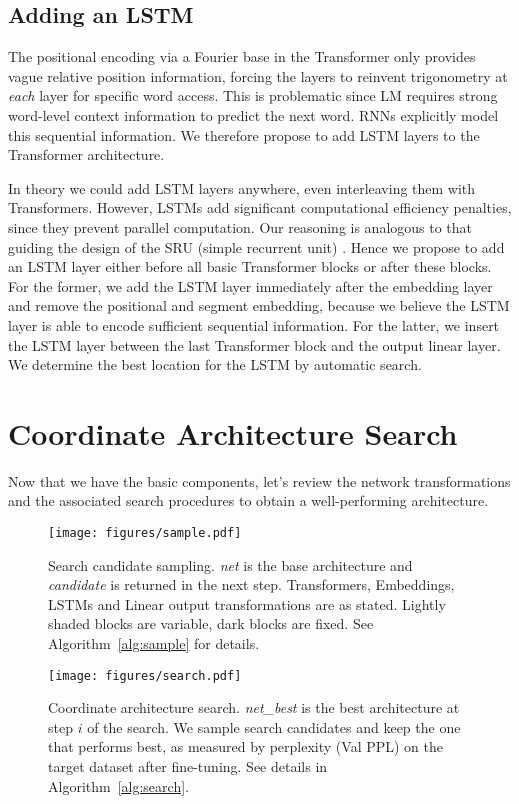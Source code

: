 \documentclass[11pt,a4paper]{article}
\begin{document}
\subsection{Adding an LSTM}

The positional encoding via a Fourier base in the Transformer only provides vague relative position information, forcing the layers to reinvent trigonometry at \emph{each} layer for specific word access. This is problematic since LM requires  strong word-level context information to predict the next word. RNNs explicitly model this sequential information. We therefore propose to add LSTM layers to the Transformer architecture. 

In theory we could add LSTM layers anywhere, even interleaving them with Transformers. However, LSTMs add significant computational efficiency penalties, since they prevent parallel computation. Our reasoning is analogous to that guiding the design of the SRU (simple recurrent unit) \cite{lei2018simple}. Hence we propose to add an LSTM layer either before all basic Transformer blocks or after these blocks. For the former, we add the LSTM layer immediately after the embedding layer and remove the positional and segment embedding, because we believe the LSTM layer is able to encode sufficient sequential information. For the latter, we insert the LSTM layer between the last Transformer block and the output linear layer. We determine the best location for the LSTM by automatic search.  \section{Coordinate Architecture Search}
\label{sec:derive}
\label{sec:algorithm}

Now that we have the basic components, let's review the network transformations and the associated search procedures to obtain a well-performing architecture.  

\begin{figure*}[t!]
    \centering
    \texttt{[image: figures/sample.pdf]}
    \caption{Search candidate sampling. \emph{net} is the base
      architecture and \emph{candidate} is returned in the next
      step. Transformers, Embeddings, LSTMs
      and Linear output transformations are as
      stated. Lightly shaded blocks are variable, dark blocks are fixed. See Algorithm~\ref{alg:sample} for details. 
      \label{fig:model-sample}}
    \smallskip
    \texttt{[image: figures/search.pdf]}
    \caption{Coordinate architecture search. \emph{net\_best} is the best
      architecture at step $i$ of the search. We sample search
      candidates and keep the one that performs best, as measured by
      perplexity (Val PPL) on the target
      dataset after fine-tuning. See details
      in Algorithm~\ref{alg:search}. 
      \label{fig:searchlanguage}}
\end{figure*}
\end{document}

